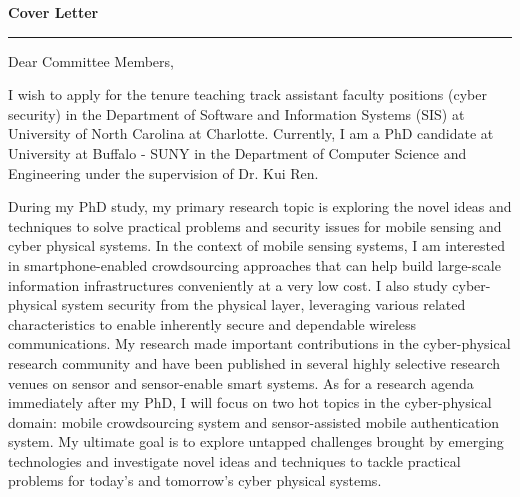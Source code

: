 \documentclass[11pt]{letter} %
\begin{document}

\begin{letter}{} 



\begin{center}
\Large\bf Cover Letter %
\vspace{20pt} \hrule height 1pt %
\end{center} 

\signature{Si Chen\\
Department of Computer Science and Engineering\\
University at Buffalo - SUNY\\
301 Davis Hall, Buffalo NY\\
(716) 335-8052} %


\opening{Dear Committee Members,} 
 
I wish to apply for the tenure teaching track assistant faculty positions (cyber security) in the Department of Software and Information Systems (SIS) at University of North Carolina at Charlotte. Currently, I am a PhD candidate at University at Buffalo - SUNY in the Department of Computer Science and Engineering under the supervision of Dr. Kui Ren. 

During my PhD study, my primary research topic is exploring the novel ideas and techniques to solve practical problems and security issues for mobile sensing and cyber physical systems. In the context of mobile sensing systems, I am interested in smartphone-enabled crowdsourcing approaches that can help build large-scale information infrastructures conveniently at a very low cost. I also study cyber-physical system security from the physical layer, leveraging various related characteristics to enable inherently secure and dependable wireless communications. My research made important contributions in the cyber-physical research community and have been published in several highly selective research venues on sensor and sensor-enable smart systems. As for a research agenda immediately after my PhD, I will focus on two hot topics in the cyber-physical domain: mobile crowdsourcing system and sensor-assisted mobile authentication system. My ultimate goal is to explore untapped challenges brought by emerging technologies and investigate novel ideas and techniques to tackle practical problems for today's and tomorrow's cyber physical systems.


\end{letter}
\end{document}
